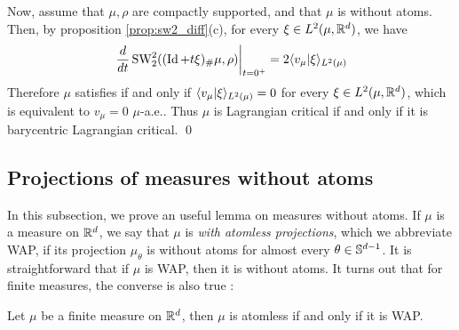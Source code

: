 Now, assume that $\mu,\rho$ are compactly supported, and that $\mu$ is without atoms. Then, by proposition \ref{prop:sw2_diff}(c), for every $\xi \in L^2(\mu,\mathbb R^d)$, we have
\begin{equation} \left.\frac{d}{dt}  \mathop{\mathrm{SW}}\nolimits_2^2((\mathop{\mathrm{Id}}\nolimits + t\xi)_{\#} \mu,\rho)\right|_{t=0^+} = 2\langle v_\mu|\xi\rangle_{L^2(\mu)} \end{equation}
Therefore $\mu$ satisfies  if and only if $\langle v_\mu|\xi\rangle_{L^2(\mu)} = 0$ for every $\xi \in L^2(\mu,\mathbb R^d)$, which is equivalent to $v_\mu = 0$ $\mu$-a.e.. Thus $\mu$ is Lagrangian critical if and only if it is barycentric Lagrangian critical. \qed

\subsection{Projections of measures without atoms}

In this subsection, we prove an useful lemma on measures without atoms. If $\mu$ is a measure on $\mathbb R^d$, we say that $\mu$ is \textit{with atomless projections}, which we abbreviate WAP, if its projection $\mu_\theta$ is without atoms for almost every $\theta \in \mathbb S^{d-1}$. It is straightforward that if $\mu$ is WAP, then it is without atoms. It turns out that for finite measures, the converse is also true :

\begin{proposition} \label{prop:atomless_is_wap}
    Let $\mu$ be a finite measure on $\mathbb R^d$, then $\mu$ is atomless if and only if it is WAP.
\end{proposition}

